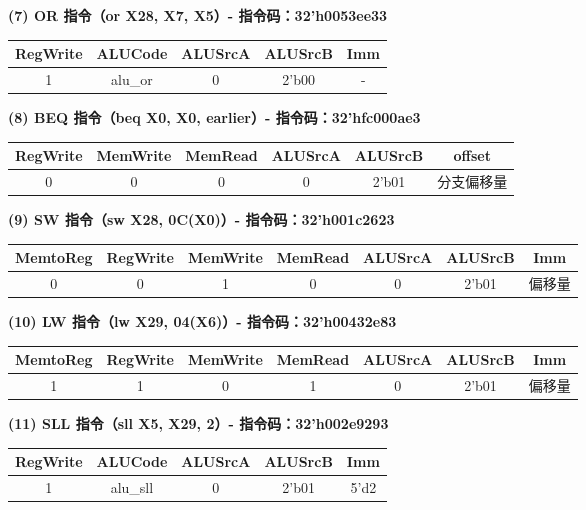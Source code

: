 \documentclass[12pt,a4paper]{article}
\begin{document}
\textbf{(7) OR 指令（or X28, X7, X5）- 指令码：32'h0053ee33}

\begin{table}[H]
\centering
\begin{tabular}{|c|c|c|c|c|}
\hline
RegWrite & ALUCode & ALUSrcA & ALUSrcB & Imm \\ \hline
1 & alu\_or & 0 & 2'b00 & - \\ \hline
\end{tabular}
\end{table}

\textbf{(8) BEQ 指令（beq X0, X0, earlier）- 指令码：32'hfc000ae3}

\begin{table}[H]
\centering
\begin{tabular}{|c|c|c|c|c|c|}
\hline
RegWrite & MemWrite & MemRead & ALUSrcA & ALUSrcB & offset \\ \hline
0 & 0 & 0 & 0 & 2'b01 & 分支偏移量 \\ \hline
\end{tabular}
\end{table}

\textbf{(9) SW 指令（sw X28, 0C(X0)）- 指令码：32'h001c2623}

\begin{table}[H]
\centering
\begin{tabular}{|c|c|c|c|c|c|c|}
\hline
MemtoReg & RegWrite & MemWrite & MemRead & ALUSrcA & ALUSrcB & Imm \\ \hline
0 & 0 & 1 & 0 & 0 & 2'b01 & 偏移量 \\ \hline
\end{tabular}
\end{table}

\textbf{(10) LW 指令（lw X29, 04(X6)）- 指令码：32'h00432e83}

\begin{table}[H]
\centering
\begin{tabular}{|c|c|c|c|c|c|c|}
\hline
MemtoReg & RegWrite & MemWrite & MemRead & ALUSrcA & ALUSrcB & Imm \\ \hline
1 & 1 & 0 & 1 & 0 & 2'b01 & 偏移量 \\ \hline
\end{tabular}
\end{table}

\textbf{(11) SLL 指令（sll X5, X29, 2）- 指令码：32'h002e9293}

\begin{table}[H]
\centering
\begin{tabular}{|c|c|c|c|c|}
\hline
RegWrite & ALUCode & ALUSrcA & ALUSrcB & Imm \\ \hline
1 & alu\_sll & 0 & 2'b01 & 5'd2 \\ \hline
\end{tabular}
\end{table}
\end{document}
